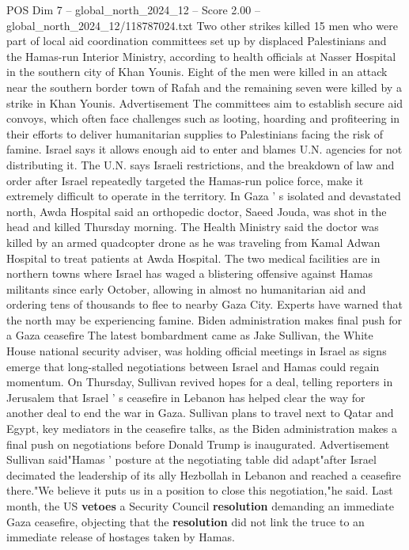 \begin{textsample}{POS Dim 7 – global\_north\_2024\_12 – Score 2.00 – global\_north\_2024\_12/118787024.txt}
Two other strikes killed 15 men who were part of local aid coordination committees set up by displaced Palestinians and the Hamas-run Interior Ministry, according to health officials at Nasser Hospital in the southern city of Khan Younis.
Eight of the men were killed in an attack near the southern border town of Rafah and the remaining seven were killed by a strike in Khan Younis.
Advertisement The committees aim to establish secure aid convoys, which often face challenges such as looting, hoarding and profiteering in their efforts to deliver humanitarian supplies to Palestinians facing the risk of famine.
Israel says it allows enough aid to enter and blames U.N. agencies for not distributing it.
The U.N. says Israeli restrictions, and the breakdown of law and order after Israel repeatedly targeted the Hamas-run police force, make it extremely difficult to operate in the territory.
In Gaza ' s isolated and devastated north, Awda Hospital said an orthopedic doctor, Saeed Jouda, was shot in the head and killed Thursday morning.
The Health Ministry said the doctor was killed by an armed quadcopter drone as he was traveling from Kamal Adwan Hospital to treat patients at Awda Hospital.
The two medical facilities are in northern towns where Israel has waged a blistering offensive against Hamas militants since early October, allowing in almost no humanitarian aid and ordering tens of thousands to flee to nearby Gaza City.
Experts have warned that the north may be experiencing famine.
Biden administration makes final push for a Gaza ceasefire The latest bombardment came as Jake Sullivan, the White House national security adviser, was holding official meetings in Israel as signs emerge that long-stalled negotiations between Israel and Hamas could regain momentum.
On Thursday, Sullivan revived hopes for a deal, telling reporters in Jerusalem that Israel ' s ceasefire in Lebanon has helped clear the way for another deal to end the war in Gaza.
Sullivan plans to travel next to Qatar and Egypt, key mediators in the ceasefire talks, as the Biden administration makes a final push on negotiations before Donald Trump is inaugurated.
Advertisement Sullivan said"Hamas ' posture at the negotiating table did adapt"after Israel decimated the leadership of its ally Hezbollah in Lebanon and reached a ceasefire there."We believe it puts us in a position to close this negotiation,"he said.
Last month, the US \textbf{vetoes} a Security Council \textbf{resolution} demanding an immediate Gaza ceasefire, objecting that the \textbf{resolution} did not link the truce to an immediate release of hostages taken by Hamas.

\end{textsample}
